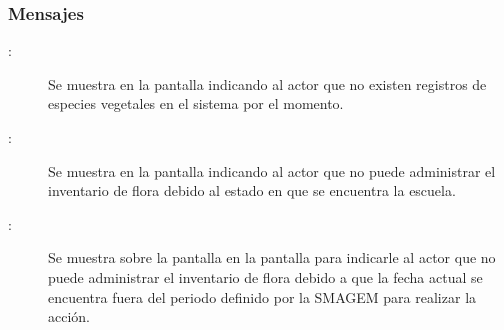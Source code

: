 \subsubsection{Mensajes}

    \begin{description}
    \item [:] Se muestra en la pantalla  indicando al actor que no existen registros de especies vegetales en el sistema por el momento.
    
    \item[:] Se muestra en la pantalla  indicando al actor que no puede administrar el inventario de flora debido al estado en que se encuentra la escuela.
    
    \item [:] Se muestra sobre la pantalla en la pantalla  para indicarle al actor que no puede administrar el inventario de flora debido a que la fecha actual se encuentra fuera del periodo definido por la SMAGEM para realizar la acción.
    \end{description}